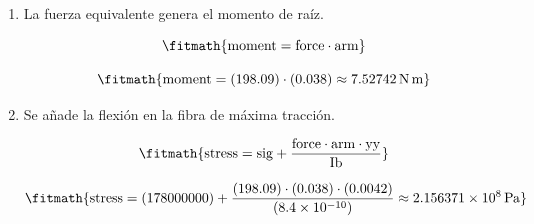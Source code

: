 \begin{enumerate}

\item La fuerza equivalente genera el momento de raíz.

\[\fitmath{\mathrm{moment}=\mathrm{force}\cdot \mathrm{arm}}\]

\[\fitmath{\mathrm{moment}=(198.09)\cdot (0.038)\approx 7.52742\,\mathrm{N\,m}}\]

\item Se añade la flexión en la fibra de máxima tracción.

\[\fitmath{\mathrm{stress}=\mathrm{sig}+\frac{\mathrm{force}\cdot \mathrm{arm}\cdot \mathrm{yy}}{\mathrm{Ib}}}\]

\[\fitmath{\mathrm{stress}=(178000000)+\frac{(198.09)\cdot (0.038)\cdot (0.0042)}{(8.4\times10^{-10})}\approx 2.156371\times10^{8}\,\mathrm{Pa}}\]

\end{enumerate}

